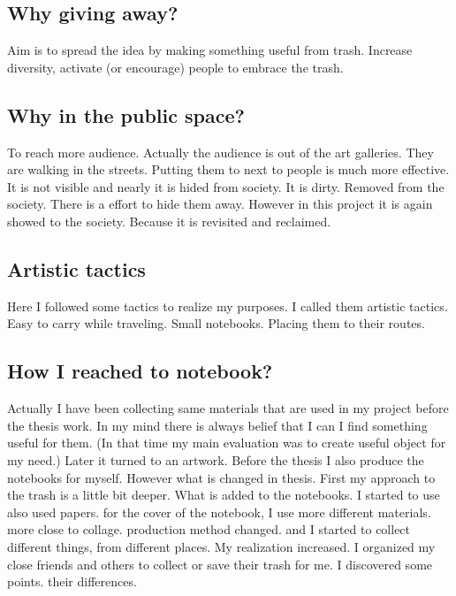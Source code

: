 \subsection{Why giving away?}
Aim is to spread the idea by making something useful from trash. Increase diversity, activate (or encourage) people to embrace the trash.

\subsection{Why in the public space?}
To reach more audience. Actually the audience is out of the art galleries. They are walking in the streets. Putting them to next to people is much more effective. It is not visible and nearly it is hided from society. It is dirty. Removed from the society. There is a effort to hide them away. However in this project it is again showed to the society. Because it is revisited and reclaimed. 


\subsection{Artistic tactics}
Here I followed some tactics to realize my purposes. I called them artistic tactics. Easy to carry while traveling. Small notebooks. Placing them to their routes. 

\subsection{How I reached to notebook?}
Actually I have been collecting same materials that are used in my project before the thesis work. In my mind there is always belief that I can I find something useful for them. (In that time my main evaluation was to create useful object for my need.) Later it turned to an artwork. Before the thesis I also produce the notebooks for myself. However what is changed in thesis. First my approach to the trash is a little bit deeper. What is added to the notebooks. I started to use also used papers. for the cover of the notebook, I use more different materials. more close to collage. production method changed. and I started to collect different things, from different places. My realization increased. I organized my close friends and others to collect or save their trash for me. I discovered some points. their differences. 

